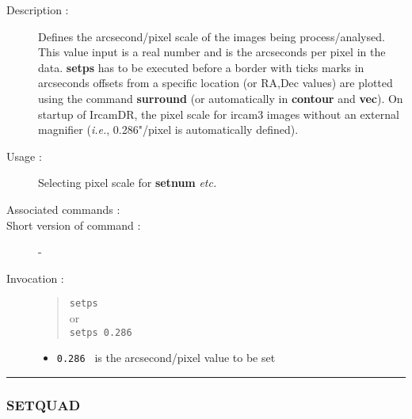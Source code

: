 \begin{description}

\item[Description :] Defines the arcsecond/pixel scale of the images
being process/analysed.  This value input is a real number and is the
arcseconds per pixel in the data.  {\bf setps} has to be executed
before a border with ticks marks in arcseconds offsets from a specific
location (or RA,Dec values) are plotted using the command {\bf
surround} (or automatically in {\bf contour} and {\bf vec}).  On
startup of {\sc IrcamDR}, the pixel scale for {\sc ircam3} images
without an external magnifier (\emph{i.e.}, 0.286"/pixel is
automatically defined).

\item[Usage :] Selecting pixel scale for {\bf setnum} \emph{etc.}
\item[Associated commands :] {\tt {}}
\item[Short version of command :] -
\item[Invocation :]

\begin{quote}{\tt  setps }\\
or \\
{\tt setps 0.286 }
\end{quote}

\begin{itemize}

\item {\tt 0.286 } is the arcsecond/pixel value to be set
\end{itemize}

\end{description}

\hrule
\subsubsection*{\label{SETQUAD}SETQUAD}

